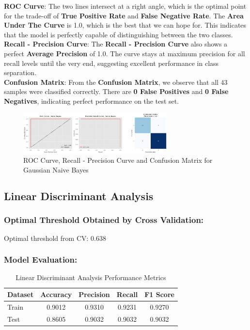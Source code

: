 \documentclass[a4paper,12pt]{article}
\begin{document}
\noindent\textbf{ROC Curve}:
The two lines intersect at a right angle, which is the optimal point for the trade-off of \textbf{True Positive Rate} and \textbf{False Negative Rate}. The \textbf{Area Under The Curve} is 1.0, which is the best that we can hope for. This indicates that the model is perfectly capable of distinguishing between the two classes. \\

\noindent\textbf{Recall - Precision Curve}:
The \textbf{Recall - Precision Curve} also shows a perfect \textbf{Average Precision} of 1.0. The curve stays at maximum precision for all recall levels until the very end, suggesting excellent performance in class separation. \\

\noindent\textbf{Confusion Matrix}:
From the \textbf{Confusion Matrix}, we observe that all 43 samples were classified correctly. There are \textbf{0 False Positives} and \textbf{0 False Negatives}, indicating perfect performance on the test set. \\

\begin{figure}[H]
    \centering
    \includegraphics[width=0.7\textwidth]{./images/roc_rpc_cm_nb.png}
    \caption{ROC Curve, Recall - Precision Curve and Confusion Matrix for Gaussian Naive Bayes}
    \label{fig:fig_4}
\end{figure}


\subsection{Linear Discriminant Analysis}
\subsubsection{Optimal Threshold Obtained by Cross Validation:}
Optimal threshold from CV: 0.638

\subsubsection{Model Evaluation:}

\begin{table}[H]
\centering
\caption{Linear Discriminant Analysis Performance Metrics}
\begin{tabular}{lcccc}
\toprule
\textbf{Dataset} & \textbf{Accuracy} & \textbf{Precision} & \textbf{Recall} & \textbf{F1 Score} \\
\midrule
Train & 0.9012 & 0.9310 & 0.9231 & 0.9270 \\
Test  & 0.8605 & 0.9032 & 0.9032 & 0.9032 \\
\bottomrule
\end{tabular}
\end{table}
\end{document}
